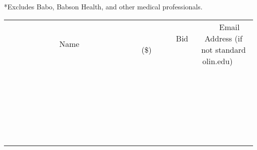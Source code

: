 \documentclass[11pt]{article}
\begin{document}
*Excludes Babo, Babson Health, and other medical professionals.
\\[6ex]
\begin{tabular}{c c c}
~~~~~~~~~~~~~Name~~~~~~~~~~~~~ & ~~~~~~~~~Bid (\$)~~~~~~~~~  & ~~~Email Address (if not standard olin.edu)~~~\\
 & & \\
\hline
 & & \\
\hline
 & & \\
\hline
 & & \\
\hline
 & & \\
\hline
 & & \\
\hline
 & & \\
\hline
 & & \\
\hline
 & & \\
\hline
 & & \\
\hline
 & & \\
\hline
 & & \\
\hline
 & & \\
\hline
 & & \\
\hline
 & & \\
\hline
 & & \\
\hline
 & & \\
\hline
 & & \\
\hline
 & & \\
\hline
 & & \\
\hline
 & & \\
\hline
 & & \\
\hline
 & & \\
\hline
 & & \\
\hline
 & & \\
\hline
 & & \\
\hline
\end{tabular}
\newpage
\end{document}
